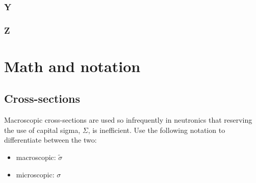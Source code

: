 \documentclass[10pt, letter]{article}
\begin{document}
\begin{multicols}{2}
\subsubsection*{Y}
\subsubsection*{Z}

\pagebreak

\section{Math and notation}\label{sec:math}

\subsection{Cross-sections}
Macroscopic cross-sections are used so infrequently in neutronics that
reserving the use of capital sigma, $\Sigma$, is inefficient. Use the
following notation to differentiate between the two:
\begin{itemize}
\item macroscopic: $\tilde{\sigma}$
\item microscopic: $\sigma$
\end{itemize}


\end{multicols}
\end{document}
